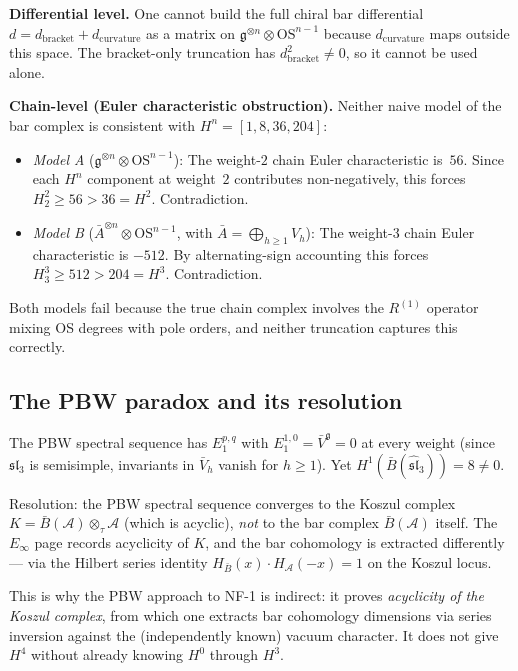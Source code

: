 \documentclass[11pt]{article}
\newcommand{\cA}{\mathcal{A}}
\newcommand{\fg}{\mathfrak{g}}
\newcommand{\fsl}{\mathfrak{sl}}
\newcommand{\B}{\bar{B}}
\begin{document}
\medskip\noindent
\textbf{Differential level.}
One cannot build the full chiral bar differential
$d = d_{\mathrm{bracket}} + d_{\mathrm{curvature}}$ as a matrix on
$\fg^{\otimes n}\otimes\mathrm{OS}^{n-1}$ because $d_{\mathrm{curvature}}$
maps outside this space.  The bracket-only truncation has
$d_{\mathrm{bracket}}^2 \neq 0$, so it cannot be used alone.

\medskip\noindent
\textbf{Chain-level (Euler characteristic obstruction).}
Neither naive model of the bar complex is consistent with
$H^n = [1,8,36,204]$:
\begin{itemize}
\item \emph{Model A} ($\fg^{\otimes n}\otimes\mathrm{OS}^{n-1}$):
  The weight-$2$ chain Euler characteristic is~$56$.  Since each
  $H^n$ component at weight~$2$ contributes non-negatively,
  this forces $H^2_2 \geq 56 > 36 = H^2$.  Contradiction.

\item \emph{Model B} ($\bar{A}^{\otimes n}\otimes\mathrm{OS}^{n-1}$,
  with $\bar{A} = \bigoplus_{h\geq 1} V_h$):
  The weight-$3$ chain Euler characteristic is $-512$.  By
  alternating-sign accounting this forces $H^3_3 \geq 512 > 204 = H^3$.
  Contradiction.
\end{itemize}
Both models fail because the true chain complex involves the
$R^{(1)}$ operator mixing OS degrees with pole orders, and neither
truncation captures this correctly.

\subsection{The PBW paradox and its resolution}

The PBW spectral sequence has $E_1^{p,q}$ with
$E_1^{1,0} = \bar{V}^{\fg} = 0$ at every weight (since
$\fsl_3$ is semisimple, invariants in $\bar{V}_h$ vanish for
$h \geq 1$).  Yet $H^1(\B(\widehat{\fsl}_3)) = 8 \neq 0$.

Resolution: the PBW spectral sequence converges to the Koszul
complex $K = \B(\cA)\otimes_\tau \cA$ (which is acyclic),
\emph{not} to the bar complex $\B(\cA)$ itself.
The $E_\infty$ page records acyclicity of $K$, and the bar
cohomology is extracted differently --- via the Hilbert series
identity $H_{\B}(x)\cdot H_{\cA}(-x) = 1$ on the Koszul locus.

This is why the PBW approach to NF-1 is indirect: it proves
\emph{acyclicity of the Koszul complex}, from which one extracts
bar cohomology dimensions via series inversion against the
(independently known) vacuum character.  It does not give $H^4$
without already knowing $H^0$ through $H^3$.
\end{document}
